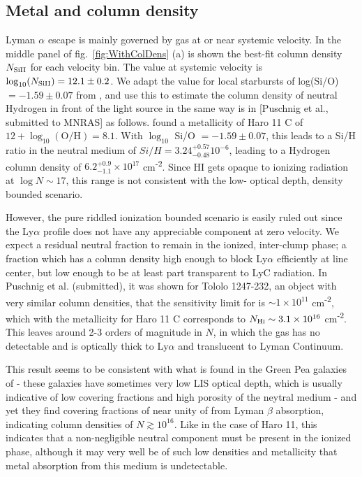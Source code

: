 \documentclass[twocolumn]{aastex61}
\begin{document}
\subsection{Metal and  column
density}\label{metal-and-column-density}

Lyman $\alpha$ escape is mainly governed by gas at or near systemic
velocity. In the middle panel of fig.~\ref{fig:WithColDens} (a) is shown
the best-fit column density $N_{\rm Si II}$ for each velocity bin. The
value at systemic velocity is $\log_{10}(N_{\rm Si II}) = 12.1 \pm 0.2$.
We adapt the value for local starbursts of log(Si/O) $= -1.59 \pm 0.07$
from \citet{Garnett1995}, and use this to estimate the column density of
neutral Hydrogen in front of the light source in the same way is in
{[}Puschnig et al., submitted to MNRAS{]} as follows. \citet{Guseva2012}
found a metallicity of Haro 11 C of $12 + \log_{10}(\text{O/H}) = 8.1$.
With $\log_{10}$ Si/O $= -1.59 \pm 0.07$, this leads to a Si/H ratio in
the neutral medium of $Si / H = 3.24^{+0.57}_{-0.48} 10^{-6}$, leading
to a Hydrogen column density of $6.2^{+0.9}_{-1.1} \times 10^{17}$
cm\textsuperscript{-2}. Since HI gets opaque to ionizing radiation at
$\log N \sim 17$, this range is not consistent with the low- optical
depth, density bounded scenario.

However, the pure riddled ionization bounded scenario is easily ruled
out since the Ly$\alpha$ profile does not have any appreciable component
at zero velocity. We expect a residual neutral fraction to remain in the
ionized, inter-clump phase; a fraction which has a column density high
enough to block Ly$\alpha$ efficiently at line center, but low enough to
be at least part transparent to LyC radiation. In Puschnig et al.
(submitted), it was shown for Tololo 1247-232, an object with very
similar  column densities, that the sensitivity limit for
 is $\sim 1 \times 10^{11}$ cm\textsuperscript{-2}, which
with the metallicity for Haro 11 C corresponds to
$N_{\text{H\textsc{i}}} \sim 3.1 \times 10^{16}$ cm\textsuperscript{-2}.
This leaves around 2-3 orders of magnitude in $N$, in which the gas has
no detectable  and is optically thick to Ly$\alpha$ and
translucent to Lyman Continuum.

This result seems to be consistent with what is found in the Green Pea
galaxies of \citep{Henry2015} - these galaxies have sometimes very low
LIS optical depth, which is usually indicative of low covering fractions
and high porosity of the neytral medium - and yet they find covering
fractions of near unity of  from Lyman $\beta$ absorption,
indicating column densities of $N \gtrsim 10^{16}$. Like in the case of
Haro 11, this indicates that a non-negligible neutral component must be
present in the ionized phase, although it may very well be of such low
densities and metallicity that metal absorption from this medium is
undetectable.
\end{document}

